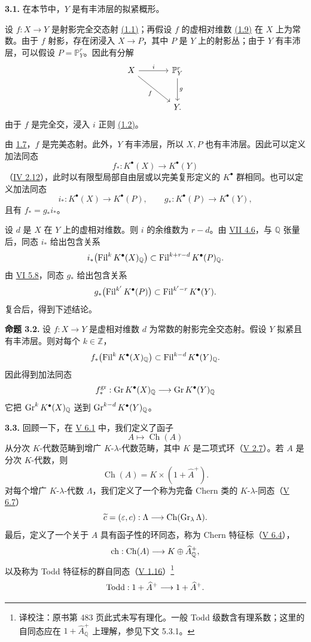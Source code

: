 \textbf{3.1.} 在本节中，$Y$ 是有丰沛层的拟紧概形。

设 $f:X\to Y$ 是射影完全交态射 \hyperlink{sga6.e08.def.1-1}{(1.1)}；再假设 $f$ 的虚相对维数 \hyperlink{sga6.e08.def.1-9}{(1.9)} 在 $X$ 上为常数。由于 $f$ 射影，存在闭浸入 $X\to P$，其中 $P$ 是 $Y$ 上的射影丛；由于 $Y$ 有丰沛层，可以假设 $P=\mathbb P^r_Y$。因此有分解
\[
\begin{tikzcd}[column sep=large,row sep=large]
X \arrow[r,"i"] \arrow[dr,"f"'] & \mathbb P^r_Y \arrow[d,"g"]\\
& Y.
\end{tikzcd}
\]
由于 $f$ 是完全交，浸入 $i$ 正则 \hyperlink{sga6.e08.prop.1-2}{(1.2)}。

由 \hyperlink{sga6.e08.prop.1-7}{1.7}，$f$ 是完美态射。此外，$Y$ 有丰沛层，所以 $X,P$ 也有丰沛层。因此可以定义加法同态
\[
f_*:K^{\bullet}(X)\longrightarrow K^{\bullet}(Y)
\]
（\hyperlink{sga6.e04.para.2-12}{IV 2.12}），此时以有限型局部自由层或以完美复形定义的 $K^{\bullet}$ 群相同。也可以定义加法同态
\[
i_*:K^{\bullet}(X)\longrightarrow K^{\bullet}(P),
\qquad
 g_*:K^{\bullet}(P)\longrightarrow K^{\bullet}(Y),
\]
且有 $f_*=g_*i_*$。

设 $d$ 是 $X$ 在 $Y$ 上的虚相对维数。则 $i$ 的余维数为 $r-d$。由 \hyperlink{sga6.e07.thm.4-6}{VII 4.6}，与 $\mathbb Q$ 张量后，同态 $i_*$ 给出包含关系
\[
i_*\bigl(\operatorname{Fil}^kK^{\bullet}(X)_{\mathbb Q}\bigr)
\subset
\operatorname{Fil}^{k+r-d}K^{\bullet}(P)_{\mathbb Q}.
\]
由 \hyperlink{sga6.e06.cor.5-8}{VI 5.8}，同态 $g_*$ 给出包含关系
\[
g_*\bigl(\operatorname{Fil}^{k'}K^{\bullet}(P)\bigr)
\subset
\operatorname{Fil}^{k'-r}K^{\bullet}(Y).
\]
复合后，得到下述结论。

\textbf{命题 3.2.} 设 $f:X\to Y$ 是虚相对维数 $d$ 为常数的射影完全交态射。假设 $Y$ 拟紧且有丰沛层。则对每个 $k\in\mathbb Z$，
\[
f_*\bigl(\operatorname{Fil}^kK^{\bullet}(X)_{\mathbb Q}\bigr)
\subset
\operatorname{Fil}^{k-d}K^{\bullet}(Y)_{\mathbb Q}.
\]
因此得到加法同态
\[
f^{\mathrm{gr}}_*:\operatorname{Gr} K^{\bullet}(X)_{\mathbb Q}\longrightarrow
\operatorname{Gr} K^{\bullet}(Y)_{\mathbb Q}
\]
它把 $\operatorname{Gr}^kK^{\bullet}(X)_{\mathbb Q}$ 送到 $\operatorname{Gr}^{k-d}K^{\bullet}(Y)_{\mathbb Q}$。

\textbf{3.3.} 回顾一下，在 \hyperlink{sga6.e05.para.6-1}{V 6.1} 中，我们定义了函子
\[
A\longmapsto \operatorname{Ch}(A)
\]
从分次 $K$-代数范畴到增广 $K$-$\lambda$-代数范畴，其中 $K$ 是二项式环（\hyperlink{sga6.e05.def.2-7}{V 2.7}）。若 $A$ 是分次 $K$-代数，则
\[
\operatorname{Ch}(A)=K\times(1+\widehat A^+).
\]
对每个增广 $K$-$\lambda$-代数 $\Lambda$，我们定义了一个称为完备 Chern 类的 $K$-$\lambda$-同态（\hyperlink{sga6.e05.para.6-7}{V 6.7}）
\[
\widetilde c=(\varepsilon,c):\Lambda\longrightarrow\operatorname{Ch}(\operatorname{Gr}_\lambda\Lambda).
\]
最后，定义了一个关于 $A$ 具有函子性的环同态，称为 Chern 特征标（\hyperlink{sga6.e05.def.6-4}{V 6.4}），
\[
\operatorname{ch}:\operatorname{Ch}(A)\longrightarrow K\oplus\widehat A^+_{\mathbb Q},
\]
以及称为 Todd 特征标的群自同态（\hyperlink{sga6.e05.para.1-16}{V 1.16}）\footnote{译校注：原书第 483 页此式未写有理化。一般 Todd 级数含有理系数；这里的自同态应在 \(1+\widehat A^+_{\mathbb Q}\) 上理解，参见下文 5.3.1。}
\[
\operatorname{Todd}:1+\widehat A^+\longrightarrow 1+\widehat A^+.
\]

